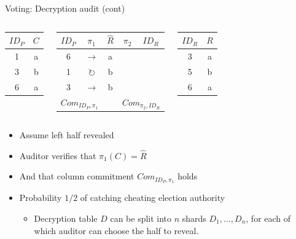 \documentclass{beamer}
\begin{document}
\begin{frame}{Voting: Decryption audit (cont)}
	\begin{columns}
		\begin{center}
			\begin{tabular}{|c|c|}
				\hline
				$ID_P$ & $C$ \\
				\hline
				1 & a \\
				3 & b \\
				6 & a \\
				\hline
			\end{tabular}
		\end{center}
		\begin{center}
			\begin{tabular}{|c|c|c|c|c|}
				\hline
				$ID_P$ & $\pi_1$ & $\hat{R}$ & $\pi_2$ & $ID_R$ \\
				\hline
				6 & $\rightarrow$       & a &                     &   \\
				1 & $\circlearrowright$ & b &                     &   \\
				3 & $\rightarrow$       & b &                     &   \\
				\hline
				\multicolumn{2}{|c|}{$Com_{ID_P, \pi_1}$} &   & \multicolumn{2}{c|}{$Com_{\pi_2, ID_R}$} \\
				\hline
			\end{tabular}
		\end{center}
		\begin{center}
			\begin{tabular}{|c|c|}
				\hline
				$ID_R$ & $R$ \\
				\hline
				3 & a \\
				5 & b \\
				6 & a \\
				\hline
			\end{tabular}
		\end{center}
	\end{columns}

	\begin{itemize}
		\item Assume left half revealed
		\item Auditor verifies that $\pi_1(C) = \hat{R}$
		\item And that column commitment $Com_{ID_P, \pi_1}$ holds
		\item Probability $1/2$ of catching cheating election authority
			\begin{itemize}
				\item Decryption table $D$ can be split into
					$n$ shards $D_1, \ldots, D_n$, for each
					of which auditor can choose the half to
					reveal.
			\end{itemize}
	\end{itemize}
\end{frame}
\end{document}
